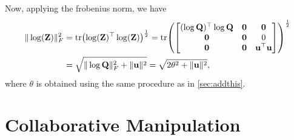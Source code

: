 Now, applying the frobenius norm, we have
\begin{align}
    \|\log(\mathbf{Z})\|_F^2 &= \operatorname{tr}\bigl(\log(\mathbf{Z})^\top\log(\mathbf{Z})\bigr)^\frac{1}{2} = \operatorname{tr}\!\left(\begin{bmatrix}
        (\log\mathbf{Q})^\top\log\mathbf{Q} & \mathbf{0} & \mathbf{0}\\
        \mathbf{0} & \mathbf{0} & 0\\
        \mathbf{0} & \mathbf{0} & \mathbf{u}^\top\mathbf{u}
    \end{bmatrix}\right)^\frac{1}{2} \\
    &= \sqrt{\|\log\mathbf{Q}\|_F^2 + \|\mathbf{u}\|^2} = \sqrt{2\theta^2 + \|\mathbf{u}\|^2},
\end{align}
where $\theta$ is obtained using the same procedure as in \cref{sec:addthis}.


\section{Collaborative Manipulation}

